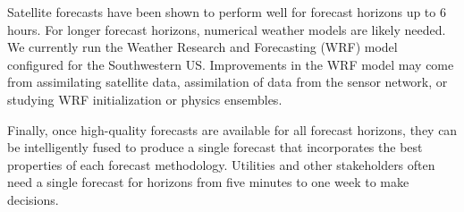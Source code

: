 Satellite forecasts have been shown to perform well for forecast
horizons up to 6 hours.
For longer forecast horizons, numerical weather models are likely
needed.
We currently run the Weather Research and Forecasting (WRF) model
configured for the Southwestern US.
Improvements in the WRF model may come from assimilating satellite
data, assimilation of data from the sensor network, or studying WRF
initialization or physics ensembles.

Finally, once high-quality forecasts are available for all forecast
horizons, they can be intelligently fused to produce a single forecast
that incorporates the best properties of each forecast methodology.
Utilities and other stakeholders often need a single forecast for
horizons from five minutes to one week to make decisions.



